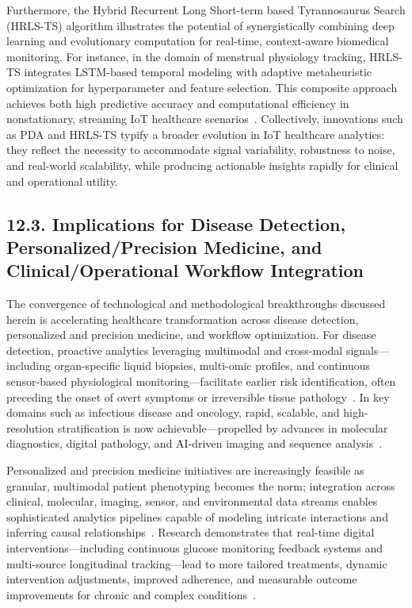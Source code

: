 \documentclass[11pt]{article}
\begin{document}
Furthermore, the Hybrid Recurrent Long Short-term based Tyrannosaurus Search (HRLS-TS) algorithm illustrates the potential of synergistically combining deep learning and evolutionary computation for real-time, context-aware biomedical monitoring. For instance, in the domain of menstrual physiology tracking, HRLS-TS integrates LSTM-based temporal modeling with adaptive metaheuristic optimization for hyperparameter and feature selection. This composite approach achieves both high predictive accuracy and computational efficiency in nonstationary, streaming IoT healthcare scenarios~\cite{ref107}. Collectively, innovations such as PDA and HRLS-TS typify a broader evolution in IoT healthcare analytics: they reflect the necessity to accommodate signal variability, robustness to noise, and real-world scalability, while producing actionable insights rapidly for clinical and operational utility.

\subsection{12.3. Implications for Disease Detection, Personalized/Precision Medicine, and Clinical/Operational Workflow Integration}

The convergence of technological and methodological breakthroughs discussed herein is accelerating healthcare transformation across disease detection, personalized and precision medicine, and workflow optimization. For disease detection, proactive analytics leveraging multimodal and cross-modal signals—including organ-specific liquid biopsies, multi-omic profiles, and continuous sensor-based physiological monitoring—facilitate earlier risk identification, often preceding the onset of overt symptoms or irreversible tissue pathology~\cite{ref21, ref51, ref63, ref82, ref94}. In key domains such as infectious disease and oncology, rapid, scalable, and high-resolution stratification is now achievable—propelled by advances in molecular diagnostics, digital pathology, and AI-driven imaging and sequence analysis~\cite{ref18, ref25, ref41, ref51, ref52, ref53, ref62, ref63, ref66, ref67, ref105}.

Personalized and precision medicine initiatives are increasingly feasible as granular, multimodal patient phenotyping becomes the norm; integration across clinical, molecular, imaging, sensor, and environmental data streams enables sophisticated analytics pipelines capable of modeling intricate interactions and inferring causal relationships~\cite{ref28, ref29, ref31, ref33, ref35, ref38, ref49, ref54, ref60, ref63, ref65, ref94, ref104}. Research demonstrates that real-time digital interventions—including continuous glucose monitoring feedback systems and multi-source longitudinal tracking—lead to more tailored treatments, dynamic intervention adjustments, improved adherence, and measurable outcome improvements for chronic and complex conditions~\cite{ref27, ref90, ref95, ref101}.
\end{document}
